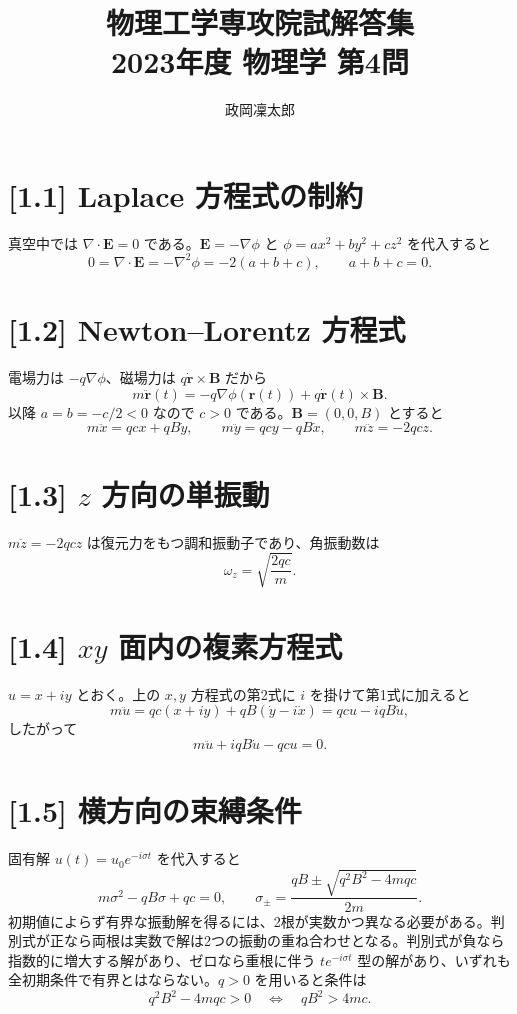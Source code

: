 \documentclass[11pt,a4paper]{article}
\title{物理工学専攻院試解答集\\2023年度 物理学 第4問}
\author{政岡凜太郎}
\date{}
\begin{document}
\maketitle

\section*{[1.1] Laplace 方程式の制約}
真空中では $\nabla\cdot\boldsymbol E=0$ である。$\boldsymbol E=-\nabla\phi$ と
$\phi=ax^2+by^2+cz^2$ を代入すると
\[
0=\nabla\cdot\boldsymbol E=-\nabla^2\phi=-2(a+b+c),
\qquad \boxed{a+b+c=0}.
\]

\section*{[1.2] Newton--Lorentz 方程式}
電場力は $-q\nabla\phi$、磁場力は $q\dot{\boldsymbol r}\times\boldsymbol B$ だから
\[
\boxed{m\ddot{\boldsymbol r}(t)=-q\nabla\phi(\boldsymbol r(t))
+q\dot{\boldsymbol r}(t)\times\boldsymbol B}.
\]
以降 $a=b=-c/2<0$ なので $c>0$ である。$\boldsymbol B=(0,0,B)$ とすると
\[
m\ddot x=qc x+qB\dot y,\qquad
m\ddot y=qc y-qB\dot x,\qquad
m\ddot z=-2qc z.
\]

\section*{[1.3] $z$ 方向の単振動}
$m\ddot z=-2qc z$ は復元力をもつ調和振動子であり、角振動数は
\[
\boxed{\omega_z=\sqrt{\frac{2qc}{m}}}.
\]

\section*{[1.4] $xy$ 面内の複素方程式}
$u=x+iy$ とおく。上の $x,y$ 方程式の第2式に $i$ を掛けて第1式に加えると
\[
m\ddot u=qc(x+iy)+qB(\dot y-i\dot x)
=qc u-iqB\dot u,
\]
したがって
\[
\boxed{m\ddot u+iqB\dot u-qc u=0}.
\]

\section*{[1.5] 横方向の束縛条件}
固有解 $u(t)=u_0e^{-i\sigma t}$ を代入すると
\[
m\sigma^2-qB\sigma+qc=0,
\qquad
\boxed{\sigma_\pm=\frac{qB\pm\sqrt{q^2B^2-4mqc}}{2m}}.
\]
初期値によらず有界な振動解を得るには、2根が実数かつ異なる必要がある。判別式が正なら両根は実数で解は2つの振動の重ね合わせとなる。判別式が負なら指数的に増大する解があり、ゼロなら重根に伴う $t e^{-i\sigma t}$ 型の解があり、いずれも全初期条件で有界とはならない。$q>0$ を用いると条件は
\[
q^2B^2-4mqc>0
\quad\Longleftrightarrow\quad
\boxed{qB^2>4mc}.
\]
\end{document}
